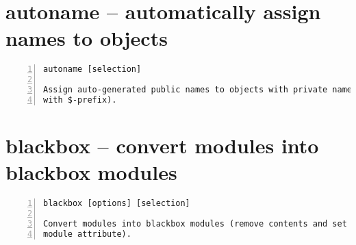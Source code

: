\section{autoname -- automatically assign names to objects}
\label{cmd:autoname}
\begin{lstlisting}[numbers=left,frame=single]
    autoname [selection]

Assign auto-generated public names to objects with private names (the ones
with $-prefix).
\end{lstlisting}

\section{blackbox -- convert modules into blackbox modules}
\label{cmd:blackbox}
\begin{lstlisting}[numbers=left,frame=single]
    blackbox [options] [selection]

Convert modules into blackbox modules (remove contents and set the blackbox
module attribute).
\end{lstlisting}

